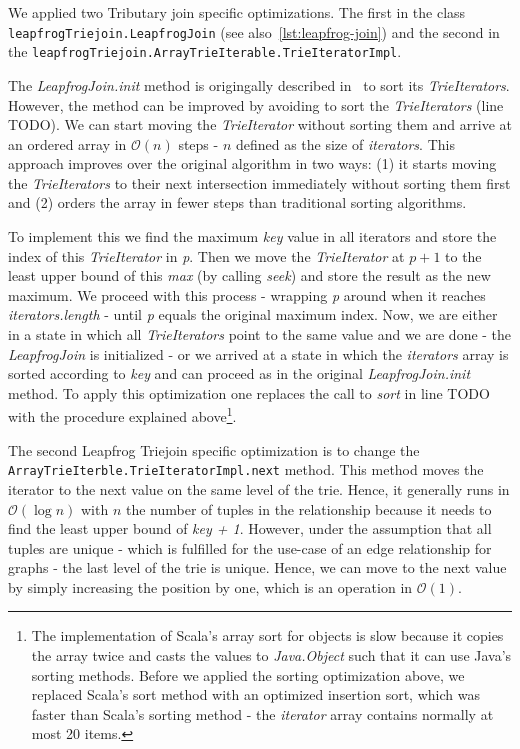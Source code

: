 We applied two Tributary join specific optimizations.
The first in the class \texttt{leapfrogTriejoin.LeapfrogJoin} (see also~\cref{lst:leapfrog-join}) and the second
in the \texttt{leapfrogTriejoin.ArrayTrieIterable.TrieIteratorImpl}.

The \textit{LeapfrogJoin.init} method is origingally described in~\cite{leapfrog} to sort its \textit{TrieIterators}.
However, the method can be improved by avoiding to sort the \textit{TrieIterators} (line TODO).  %
We can start moving the \textit{TrieIterator} without sorting them and arrive at an ordered array in $\mathcal{O} (n)$ steps - $n$ defined as the size of \textit{iterators}.
This approach improves over the original algorithm in two ways: (1) it starts moving the \textit{TrieIterators} to their next intersection immediately without sorting them first and
(2) orders the array in fewer steps than traditional sorting algorithms.

To implement this we find the maximum \textit{key} value in all iterators and store the index of this \textit{TrieIterator} in \textit{p}.
Then we move the \textit{TrieIterator} at $p + 1$ to the least upper bound of this \textit{max} (by calling \textit{seek}) and store the result as the new maximum.
We proceed with this process - wrapping \textit{p} around when it reaches \textit{iterators.length} - until \textit{p} equals the original maximum index.
Now, we are either in a state in which all \textit{TrieIterators} point to the same value and we are done - the \textit{LeapfrogJoin} is initialized -
or we arrived at a state in which the \textit{iterators} array is sorted according to \textit{key} and can proceed as in the original \textit{LeapfrogJoin.init} method.
To apply this optimization one replaces the call to \textit{sort} in line TODO with the procedure explained above\footnote{The implementation of Scala's array sort for objects is slow
because it copies the array twice and casts the values to \textit{Java.Object} such that it can use Java's sorting methods.
Before we applied the sorting optimization above, we replaced Scala's sort
method with an optimized insertion sort, which was faster than Scala's sorting method - the \textit{iterator} array contains normally at most 20 items.}.

The second Leapfrog Triejoin specific optimization is to change the \texttt{ArrayTrieIterble.TrieIteratorImpl.next} method.
This method moves the iterator to the next value on the same level of the trie.
Hence, it generally runs in $\mathcal{O} (\log n)$ with $n$ the number of tuples in the relationship because it needs to find the least upper bound of \textit{key + 1}.
However, under the assumption that all tuples are unique - which is fulfilled for the use-case of an edge relationship for graphs - the last level of the trie
is unique.
Hence, we can move to the next value by simply increasing the position by one, which is an operation in $\mathcal{O} (1)$.

